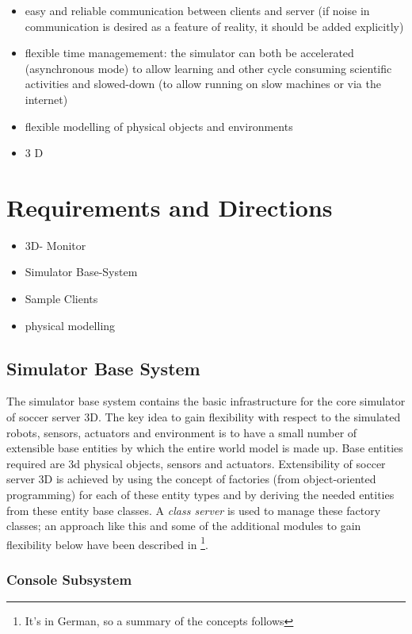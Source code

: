 \documentclass[a4paper,12pt]{article}
\begin{document}
\begin{itemize}
\item easy and reliable communication between clients and server (if
  noise in communication is desired as a feature of reality, it should
  be added explicitly)
\item flexible time managemement: the simulator can both be
  accelerated (asynchronous mode) to allow learning and other cycle
  consuming scientific activities and slowed-down (to allow running on
  slow machines or via the internet)
\item flexible modelling of physical objects and environments
\item 3 D
\end{itemize}

\section{Requirements and Directions}

\begin{itemize}
\item 3D- Monitor
\item Simulator Base-System
\item Sample Clients
\item physical modelling
\end{itemize}


\subsection{Simulator Base System}
\label{sec:sbs}

The simulator base system contains the basic infrastructure for the
core simulator of soccer server 3D. The key idea to gain flexibility
with respect to the simulated robots, sensors, actuators and
environment is to have a small number of extensible base entities by
which the entire world model is made up. Base entities required are 3d
physical objects, sensors and actuators. Extensibility of soccer server
3D is achieved by using the
concept of factories (from object-oriented programming) for each of
these entity types and by deriving the needed entities from these
entity base classes. A \emph{class server} is used to manage these
factory classes; an approach like this and some of the additional
modules to gain flexibility below have been described in
\cite{ABF+02}\footnote{It's in German, so a summary of the concepts
  follows}.


\subsubsection{Console Subsystem}
\end{document}
